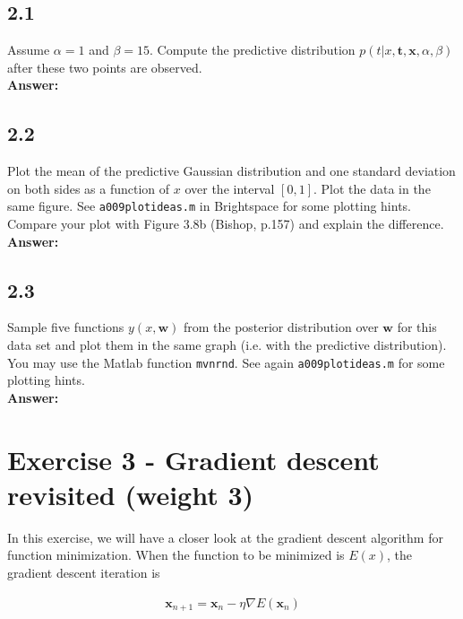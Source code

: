 \documentclass[a4paper]{article}
\begin{document}
\subsection*{2.1}

Assume $\alpha = 1$ and $\beta = 15$. Compute the predictive distribution $p(t|x, \textbf{t}, \textbf{x}, \alpha, \beta)$ after these two points are observed.\\

\textbf{Answer:}\\


\subsection*{2.2}


Plot the mean of the predictive Gaussian distribution and one standard deviation on both sides as a function of $x$ over the interval $[0,1]$. Plot the data in the same figure. See \texttt{a009plotideas.m} in Brightspace for some plotting hints. Compare your plot with Figure 3.8b (Bishop, p.157) and explain the difference.\\

\textbf{Answer:}\\



\subsection*{2.3}

Sample five functions $y(x,\textbf{w})$ from the posterior distribution over $\textbf{w}$ for this data set and plot them in the same graph (i.e. with the predictive distribution). You may use the Matlab function \texttt{mvnrnd}. See again \texttt{a009plotideas.m} for some plotting hints.\\

\textbf{Answer:}\\



\section*{Exercise 3 - Gradient descent revisited (weight 3)}

In this exercise, we will have a closer look at the gradient descent algorithm for function minimization. When the function to be minimized is $E(x)$, the gradient descent iteration is


\begin{eqnarray}
\textbf{x}_{n + 1} = \textbf{x}_n - \eta \nabla E(\textbf{x}_n)
\end{eqnarray}
\end{document}
